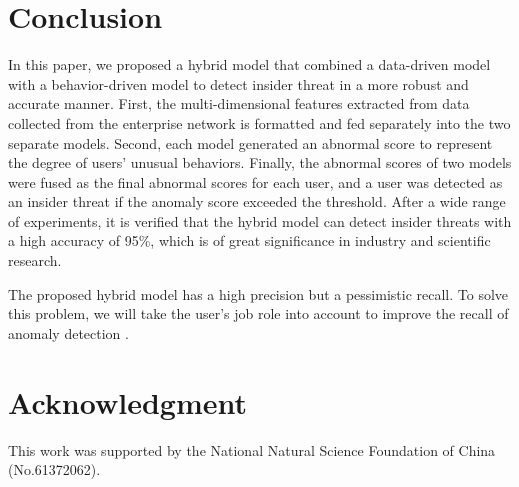 \documentclass[conference]{IEEEtran}
\begin{document}
\section{Conclusion}

In this paper, we proposed a hybrid model that combined a data-driven model with a behavior-driven model to detect insider threat in a more robust and accurate manner. 
First, the multi-dimensional features extracted from data collected from the enterprise network is formatted and fed separately into the two separate models. Second, each model generated an abnormal score to represent the degree of users' unusual behaviors. Finally, the abnormal scores of two models were fused as the final abnormal scores for each user, and a user was detected as an insider threat if the anomaly score exceeded the threshold. After a wide range of experiments, it is verified that the hybrid model can detect insider threats with a high accuracy of 95\%, which is of great significance in industry and scientific research.

The proposed hybrid model has a high precision but a pessimistic recall. To solve this problem, we will take the user’s job role into account to improve the recall of anomaly detection  \cite{b16}.       



\section*{Acknowledgment}

This work was supported by the National Natural Science Foundation of China (No.61372062).
\end{document}

